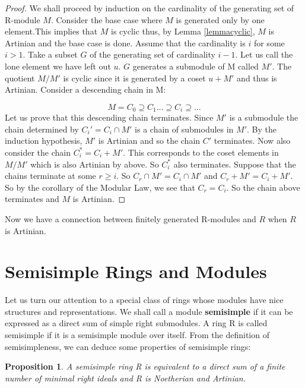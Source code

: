 \documentclass[11pt]{article}
\newtheorem{proposition}{Proposition}
\begin{document}
\noindent
\begin{proof} We shall proceed by induction on the cardinality of the generating set of R-module $M$. Consider the base case where $M$ is generated only by one element.This implies that $M$ is cyclic thus, by Lemma \ref{lemmacyclic}, $M$ is Artinian and the base case is done.
Assume that the cardinality is $i$ for some $i > 1$. Take a subset $G$ of the generating set of cardinality $i-1$. Let us call the lone element we have left out $u$. $G$ generates a submodule of M called $M'$. The quotient $M/M'$ is cyclic since it is generated by a coset $u + M'$ and thus is Artinian. Consider a descending chain in M:

\begin{equation}
 M = C_0 \supseteq C_1 ... \supseteq C_{i} \supseteq ...
\end{equation}
Let us prove that this descending chain terminates. Since $M'$ is a submodule the chain determined by $C_i' = C_i \cap M'$ is a chain of submodules in $M'$. By the induction hypothesis, $M'$ is Artinian and so the chain $C'$ terminates. Now also consider the chain
$C_i^* = C_i + M'$. This corresponds to the coset elements in $M/M'$ which is also Artinian by above. So $C_i^*$ also terminates. Suppose that the chains terminate at some $r \geq i$. So $C_r \cap M' = C_i \cap M'$ and $C_r + M' = C_i + M'$. So by the corollary of the Modular Law, we see that
$C_r = C_i$. So the chain above terminates and $M$ is Artinian. \end{proof}

Now we have a connection between finitely generated R-modules and $R$ when $R$ is Artinian.\newline

\section{Semisimple Rings and Modules}

Let us turn our attention to a special class of rings whose modules have nice structures and representations. We shall call a module \textbf{semisimple} if it can be expressed as a direct sum of simple right submodules. A ring R is called semisimple if it is a semisimple module over itself. From the definition of semisimpleness, we can deduce some properties of semisimple rings:

\noindent
\begin{proposition} A semisimple ring R is equivalent to a direct sum of a finite number of minimal right ideals and R is Noetherian and Artinian. \end{proposition}
\end{document}
